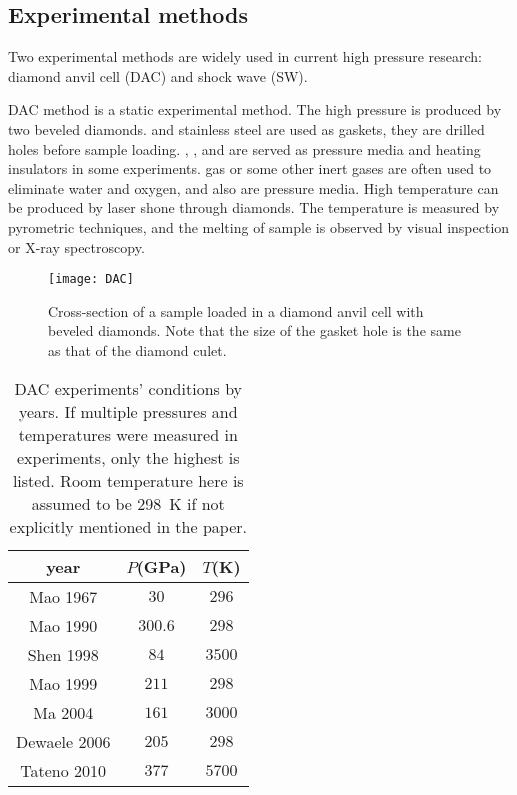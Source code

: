 
\subsection{Experimental methods}
\label{ssec:exp}

Two experimental methods are widely used in current high pressure research:
diamond anvil cell (DAC) and shock wave (SW).

DAC method is a static experimental method. The high pressure is produced by two beveled diamonds.  and stainless steel are used as gaskets, they are drilled holes before sample loading.
, , and  are served as pressure media and heating insulators in some experiments\cite{Anonymous:2004gu}.
 gas or some other inert gases are often used to eliminate water
and oxygen, and also are pressure media.
High temperature can be produced by laser shone through diamonds.
The temperature is measured by pyrometric techniques,
and the melting of sample is observed by
visual inspection or X-ray spectroscopy\cite{Sola:2009dw}.

\begin{figure}[h]
	\centering
	\texttt{[image: DAC]}
	\caption{Cross-section of a sample loaded in a diamond anvil cell with beveled diamonds. Note that the size of the gasket hole is the same as that of the diamond culet\cite{Anonymous:2004gu}.}
	\label{fig:dac}
\end{figure}

\begin{table}[htbp]
	\centering
	\caption{DAC experiments' conditions by years. If multiple pressures
		and temperatures were measured in experiments,
		only the highest is listed. Room temperature here is assumed to be
		\SI{298}{\kelvin} if not explicitly mentioned in the paper.}
	\begin{tabular}{ccc}
		\toprule
		year                              & $P$(\si{\giga\pascal}) & $T$(\si{\kelvin}) \\
		\midrule
		Mao 1967\cite{Mao:1967iz}         & $30$                   & $296$             \\
		Mao 1990\cite{Mao:1990ev}         & $ 300.6 $              & $ 298 $           \\
		Shen 1998\cite{Shen:1998bt}       & $ 84 $                 & $ 3500 $          \\
		Mao 1999\cite{Mao:1999fg}         & $ 211 $                & $ 298 $           \\
		Ma 2004\cite{Anonymous:2004gu}    & $ 161 $                & $ 3000 $          \\
		Dewaele 2006\cite{Dewaele:2006ha} & $ 205 $                & $ 298 $           \\
		Tateno 2010\cite{Tateno:2010io}   & $ 377 $                & $ 5700 $          \\
		\bottomrule
	\end{tabular}%
	\label{tab:dac}%
\end{table}%

